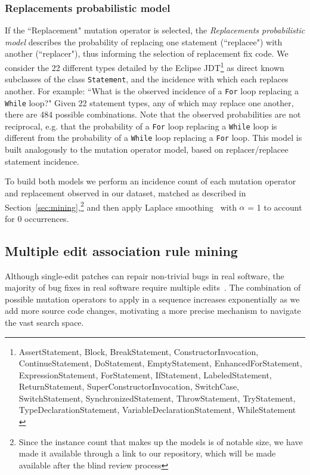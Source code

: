 \documentclass[conference]{IEEEtran}
\begin{document}
\subsubsection{Replacements probabilistic model}
If the ``Replacement" mutation operator is 
selected, the \textit{Replacements probabilistic model} describes the probability of replacing one statement (``replacee") with
another (``replacer"), thus informing the selection of replacement fix code.
We consider 
the 22 different types detailed by the Eclipse
JDT\footnote{AssertStatement, Block, BreakStatement, ConstructorInvocation, ContinueStatement, DoStatement, EmptyStatement, EnhancedForStatement, ExpressionStatement, ForStatement, IfStatement, LabeledStatement, ReturnStatement, SuperConstructorInvocation, SwitchCase, SwitchStatement, SynchronizedStatement, ThrowStatement, TryStatement, TypeDeclarationStatement, VariableDeclarationStatement, WhileStatement \label{stmtNames}} as
direct known subclasses of the class \texttt{Statement}, and the incidence with which
each 
replaces another. For example: ``What is the observed incidence of a \texttt{For} loop 
replacing a \texttt{While} loop?" Given 22 statement types, any of which may replace one
another, there are 484 possible combinations. 
Note that the observed probabilities are not reciprocal, e.g. 
that the probability of a \texttt{For} loop replacing a \texttt{While} loop is different from the 
probability of a \texttt{While} loop replacing a \texttt{For} loop.
This model is built analogously to the
mutation operator model, based on replacer/replacee statement incidence. 

\vspace{1ex}
To build both models we perform an incidence count of each mutation operator and replacement observed in our
dataset, matched as described in Section~\ref{sec:mining},\footnote{Since the instance count that makes up the models is of notable size, we have made it available through a link to our repository, which will be made available after the blind review process} %
and then apply Laplace smoothing~\cite{Russell10} with $\alpha$ = 1 to account for 0 occurrences.

\subsection{Multiple edit association rule mining} 
\label{multEdit}

Although single-edit patches can
repair non-trivial bugs in real software, the majority of bug fixes in real
software require multiple edits~\cite{zhong15,Soto16}. The combination of possible mutation
 operators to apply in a sequence increases exponentially as we add more source
 code changes, motivating a more precise mechanism to navigate the vast search
 space. 
\end{document}
